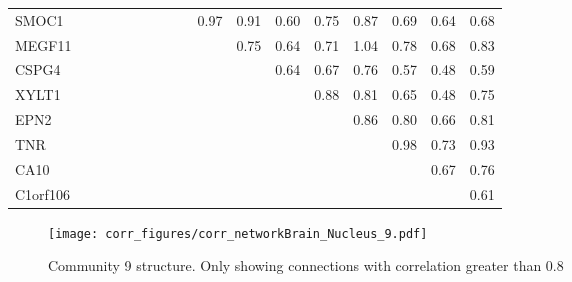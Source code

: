 \begin{longtable}{lrrrrrrrrrrrrrrrr}
SMOC1    &             &              &            &              &            &             &              &             &         0.97 &        0.91 &        0.60 &       0.75 &      0.87 &       0.69 &           0.64 &        0.68 \\
MEGF11   &             &              &            &              &            &             &              &             &              &        0.75 &        0.64 &       0.71 &      1.04 &       0.78 &           0.68 &        0.83 \\
CSPG4    &             &              &            &              &            &             &              &             &              &             &        0.64 &       0.67 &      0.76 &       0.57 &           0.48 &        0.59 \\
XYLT1    &             &              &            &              &            &             &              &             &              &             &             &       0.88 &      0.81 &       0.65 &           0.48 &        0.75 \\
EPN2     &             &              &            &              &            &             &              &             &              &             &             &            &      0.86 &       0.80 &           0.66 &        0.81 \\
TNR      &             &              &            &              &            &             &              &             &              &             &             &            &           &       0.98 &           0.73 &        0.93 \\
CA10     &             &              &            &              &            &             &              &             &              &             &             &            &           &            &           0.67 &        0.76 \\
C1orf106 &             &              &            &              &            &             &              &             &              &             &             &            &           &            &                &        0.61 \\
\end{longtable}


\begin{figure}[h!]
\centering
\texttt{[image: corr\_figures/corr\_networkBrain\_Nucleus\_9.pdf]}
\caption{Community 9 structure. Only showing connections with correlation greater than 0.8}
\end{figure}




